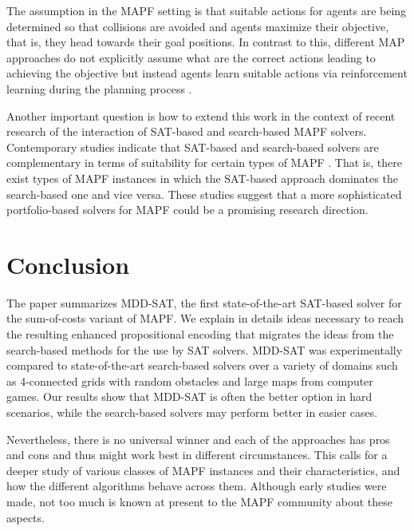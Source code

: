 \documentclass[jair,oneside,11pt]{article}
\begin{document}
The assumption in the MAPF setting is that suitable actions for agents are being determined so that collisions are avoided and agents maximize their objective, that is, they head towards their goal positions. In contrast to this, different MAP approaches do not explicitly assume what are the correct actions leading to achieving the objective but instead agents learn suitable actions via reinforcement learning during the planning process \cite{DBLP:journals/jmlr/KokV06}.

Another important question is how to extend this work in the context of recent research of the interaction of SAT-based and search-based MAPF solvers. Contemporary studies indicate that SAT-based and search-based solvers are complementary in terms of suitability for certain types of MAPF \cite{DBLP:conf/aips/KaduriBS20,kaduri2021experimental}. That is, there exist types of MAPF instances in which the SAT-based approach dominates the search-based one and vice versa. These studies suggest that a more sophisticated portfolio-based solvers for MAPF could be a promising research direction.

\section{Conclusion}

The paper summarizes MDD-SAT, the first state-of-the-art SAT-based solver for the sum-of-costs variant of MAPF.  We explain in details ideas necessary to reach the resulting enhanced propositional encoding that migrates the ideas from the search-based methods for the use by SAT solvers. MDD-SAT was experimentally compared to state-of-the-art search-based solvers over a variety of domains such as 4-connected grids with random obstacles and large maps from computer games. Our results show that MDD-SAT is often the better option in hard scenarios, while the search-based solvers may perform better in easier cases.

Nevertheless, there is no universal winner and each of the approaches has pros and cons and thus might work best in different circumstances. This calls for a deeper study of various classes of MAPF instances and their characteristics, and how the different algorithms behave across them. Although early studies were made, not too much is known at present to the MAPF community about these aspects.

\end{document}
